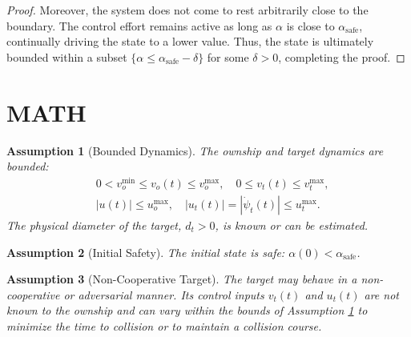 \documentclass[10pt]{article}
\newtheorem{assumption}{Assumption}
\begin{document}
\begin{proof}
    Moreover, the system does not come to rest arbitrarily close to the boundary. The control effort remains active as long as $\alpha$ is close to $\alpha_{\text{safe}}$, continually driving the state to a lower value. Thus, the state is ultimately bounded within a subset $\{ \alpha \leq \alpha_{\text{safe}} - \delta \}$ for some $\delta > 0$, completing the proof.
\end{proof}


\section{MATH}

\begin{assumption}[Bounded Dynamics]\label{assump:bounds}
    The ownship and target dynamics are bounded:
    \begin{align*}
        &0 < v_o^{\min} \leq v_o(t) \leq v_o^{\max}, \quad
        0 \leq v_t(t) \leq v_t^{\max}, \\
        &|u(t)| \leq u_o^{\max}, \quad
        |u_t(t)| = |\dot{\psi}_t(t)| \leq u_t^{\max}.
    \end{align*}
    The physical diameter of the target, $d_t > 0$, is known or can be estimated.
\end{assumption}

\begin{assumption}[Initial Safety]\label{assump:init}
    The initial state is safe: $\alpha(0) < \alpha_{\text{safe}}$.
\end{assumption}

\begin{assumption}[Non-Cooperative Target]\label{assump:adversarial}
    The target may behave in a non-cooperative or adversarial manner. Its control inputs $v_t(t)$ and $u_t(t)$ are not known to the ownship and can vary within the bounds of Assumption \ref{assump:bounds} to minimize the time to collision or to maintain a collision course.
\end{assumption}
\end{document}
